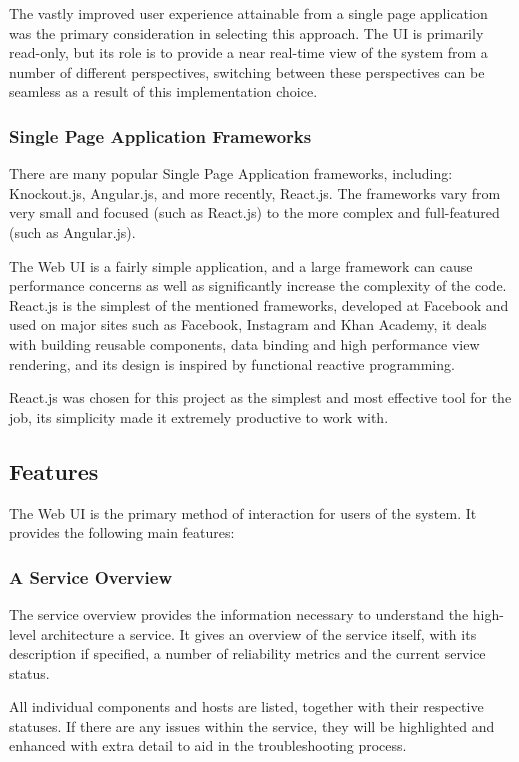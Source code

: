 \documentclass{cshonours}
\begin{document}
The vastly improved user experience attainable from a single page application was the primary consideration in selecting this approach. The UI is primarily read-only, but its role is to provide a near real-time view of the system from a number of different perspectives, switching between these perspectives can be seamless as a result of this implementation choice.

\subsubsection{Single Page Application Frameworks}

There are many popular Single Page Application frameworks, including: Knockout.js, Angular.js, and more recently, React.js. The frameworks vary from very small and focused (such as React.js) to the more complex and full-featured (such as Angular.js).

The Web UI is a fairly simple application, and a large framework can cause performance concerns as well as significantly increase the complexity of the code. React.js is the simplest of the mentioned frameworks, developed at Facebook and used on major sites such as Facebook, Instagram and Khan Academy, it deals with building reusable components, data binding and high performance view rendering, and its design is inspired by functional reactive programming.

React.js was chosen for this project as the simplest and most effective tool for the job, its simplicity made it extremely productive to work with.

\subsection{Features}

The Web UI is the primary method of interaction for users of the system. It provides the following main features:

\subsubsection{A Service Overview}

The service overview provides the information necessary to understand the high-level architecture a service. It gives an overview of the service itself, with its description if specified, a number of reliability metrics and the current service status.

All individual components and hosts are listed, together with their respective statuses. If there are any issues within the service, they will be highlighted and enhanced with extra detail to aid in the troubleshooting process.
\end{document}
